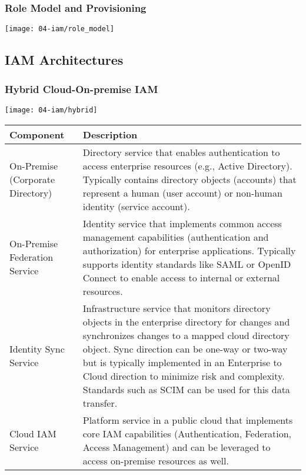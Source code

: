\subsubsection{Role Model and Provisioning}
\begin{center}
    \texttt{[image: 04-iam/role\_model]}
    \vspace{-8pt}
\end{center}

\subsection{IAM Architectures}

\subsubsection{Hybrid Cloud-On-premise IAM}
\begin{center}
    \texttt{[image: 04-iam/hybrid]}
    \vspace{-8pt}
\end{center}

\begin{table}[h]
    \centering
    \begin{tabular}{p{4cm} | p{12cm}}
        \bfseries{Component} & \bfseries{Description}\\ \hline
        On-Premise (Corporate Directory) & Directory service that enables authentication to access enterprise resources (e.g., Active Directory). Typically contains directory objects (accounts) that represent a human (user account) or non-human identity (service account).\\ \hline
        On-Premise Federation Service & Identity service that implements common access management capabilities (authentication and authorization) for enterprise applications. Typically supports identity standards like SAML or OpenID Connect to enable access to internal or external resources.\\ \hline
        Identity Sync Service & Infrastructure service that monitors directory objects in the enterprise directory for changes and synchronizes changes to a mapped cloud directory object. Sync direction can be one-way or two-way but is typically implemented in an Enterprise to Cloud direction to minimize risk and complexity. Standards such as SCIM can be used for this data transfer.\\ \hline
        Cloud IAM Service & Platform service in a public cloud that implements core IAM capabilities (Authentication, Federation, Access Management) and can be leveraged to access on-premise resources as well.
    \end{tabular}
\end{table}

